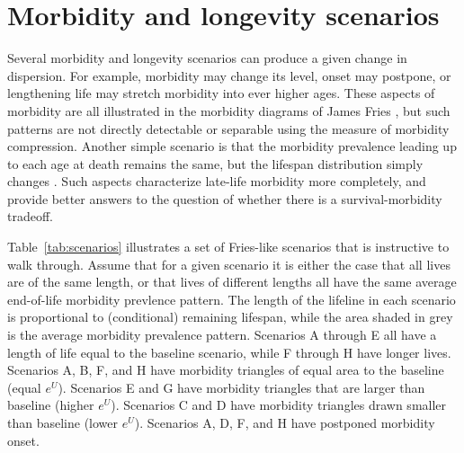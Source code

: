 \documentclass{article}
\begin{document}
\section*{Morbidity and longevity scenarios}
Several morbidity and longevity scenarios can produce a given change in 
dispersion. For example, morbidity may change its level, onset may
postpone, or lengthening life may stretch morbidity into ever
higher ages. These aspects of morbidity are all illustrated in the morbidity
diagrams of James Fries \citep[e.g.,][]{fries2003measuring}, but such
patterns are not directly detectable or separable using the measure of morbidity
compression. Another simple scenario is that the morbidity prevalence leading up to each age at death remains the
same, but the lifespan distribution simply changes \citep{vanRaalte2015HLE}.
Such aspects characterize late-life morbidity more completely, and provide
better answers to the question of whether there is a survival-morbidity tradeoff.

Table~\ref{tab:scenarios} illustrates a set of Fries-like scenarios that is
instructive to walk through. Assume that for a given scenario it is either the
case that all lives are of the same length, or that lives of different lengths
all have the same average end-of-life morbidity prevlence pattern. The length of
the lifeline in each scenario is proportional to (conditional) remaining
lifespan, while the area shaded in grey is the average morbidity prevalence
pattern.
Scenarios A through E all have a length of life equal to the baseline scenario, while F through H have longer lives. Scenarios A, B, F, and H have morbidity triangles
of equal area to the baseline (equal $e^U$). Scenarios E and G have morbidity
triangles that are larger than baseline (higher $e^U$). Scenarios C and D have
morbidity triangles drawn smaller than baseline (lower $e^U$). Scenarios A, D,
F, and H have postponed morbidity onset.
\end{document}
